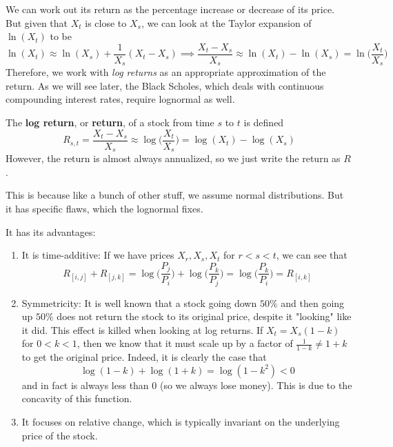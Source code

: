 \documentclass{article}
\begin{document}
    We can work out its return as the percentage increase or decrease of its price. But given that $X_t$ is close to $X_s$, we can look at the Taylor expansion of $\ln(X_t)$ to be 
    \begin{equation}
      \ln(X_t) \approx \ln(X_s) + \frac{1}{X_s} (X_t - X_s) \implies \frac{X_t - X_s}{X_s} \approx \ln (X_t) - \ln (X_s) = \ln \bigg( \frac{X_t}{X_s} \bigg)
    \end{equation}
    Therefore, we work with \textit{log returns} as an appropriate approximation of the return. As we will see later, the Black Scholes, which deals with continuous compounding interest rates, require lognormal as well. 

    \begin{definition}
      The \textbf{log return}, or \textbf{return}, of a stock from time $s$ to $t$ is defined 
      \begin{equation}
        R_{s, t} = \frac{X_t - X_s}{X_s} \approx \log\bigg( \frac{X_t}{X_s} \bigg) = \log(X_t) - \log(X_s)
      \end{equation}
      However, the return is almost always annualized, so we just write the return as $R$. 
    \end{definition}

    \begin{question}[Lognormal]
      This is because like a bunch of other stuff, we assume normal distributions. But it has specific flaws, which the lognormal fixes. 
    \end{question}

    \begin{definition}
      
    \end{definition}

    It has its advantages: 
    \begin{enumerate}
      \item It is time-additive: If we have prices $X_r, X_s, X_t$ for $r < s < t$, we can see that 
      \begin{equation}
        R_{[i, j]} + R_{[j, k]} = \log \bigg(\frac{P_j}{P_i}\bigg) + \log \bigg( \frac{P_k}{P_j} \bigg) = \log \bigg(\frac{P_k}{P_i} \bigg) = R_{[i, k]}
      \end{equation}

      \item Symmetricity: It is well known that a stock going down $50\%$ and then going up $50\%$ does not return the stock to its original price, despite it "looking" like it did. This effect is killed when looking at log returns. If $X_t = X_s (1 - k)$ for $0 < k < 1$, then we know that it must scale up by a factor of $\frac{1}{1 - k} \neq 1 + k$ to get the original price. Indeed, it is clearly the case that 
      \[\log(1 - k) + \log(1 + k) = \log(1 - k^2) < 0\]
      and in fact is always less than $0$ (so we always lose money). This is due to the concavity of this function. 
      
      \item It focuses on relative change, which is typically invariant on the underlying price of the stock. 
    \end{enumerate}
\end{document}
